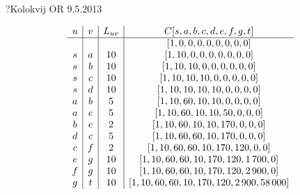 \begin{naloga}{?}{Kolokvij OR 9.5.2013}
\begin{odgovor}
\begin{tabela}
$$
\begin{array}{c|c|c|c}
u & v & L_{uv} & C[s, a, b, c, d, e, f, g, t] \\ \hline
  &   &        & [1, 0, 0, 0, 0, 0, 0, 0, 0] \\
s & a &     10 & [1, 10, 0, 0, 0, 0, 0, 0, 0] \\
s & b &     10 & [1, 10, 10, 0, 0, 0, 0, 0, 0] \\
s & c &     10 & [1, 10, 10, 10, 0, 0, 0, 0, 0] \\
s & d &     10 & [1, 10, 10, 10, 10, 0, 0, 0, 0] \\
a & b &      5 & [1, 10, 60, 10, 10, 0, 0, 0, 0] \\
a & e &      5 & [1, 10, 60, 10, 10, 50, 0, 0, 0] \\
b & e &      2 & [1, 10, 60, 10, 10, 170, 0, 0, 0] \\
d & c &      5 & [1, 10, 60, 60, 10, 170, 0, 0, 0] \\
c & f &      2 & [1, 10, 60, 60, 10, 170, 120, 0, 0] \\
e & g &     10 & [1, 10, 60, 60, 10, 170, 120, 1\,700, 0] \\
f & g &     10 & [1, 10, 60, 60, 10, 170, 120, 2\,900, 0] \\
g & t &     10 & [1, 10, 60, 60, 10, 170, 120, 2\,900, 58\,000]
\end{array}
$$
\end{tabela}
\end{odgovor}
\end{naloga}
